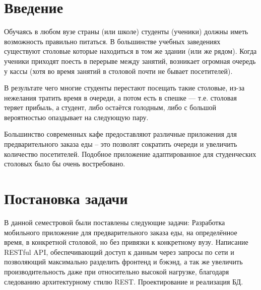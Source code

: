 \documentclass[14pt]{matmex-diploma-custom}
\begin{document}
\maketitle
\tableofcontents

\section{Введение}
    Обучаясь в любом вузе страны (или школе) студенты (ученики) должны иметь возможность правильно питаться.
    В большинстве учебных заведениях существуют столовые которые находиться в том же здании (или же рядом).
    Когда ученики приходят поесть в перерыве между занятий, возникает огромная очередь у кассы (хотя во время занятий в столовой почти не бывает посетителей).

    В результате чего многие студенты перестают посещать такие столовые, из-за нежелания тратить время в очереди, а потом есть в спешке — т.е. столовая теряет прибыль, а студент, либо остаётся голодным, либо с большой вероятностью опаздывает на следующую пару.

    Большинство современных кафе предоставляют различные приложения для предварительного заказа еды -- это позволят сократить очереди и увеличить количество посетителей. Подобное приложение адаптированное для студенческих столовых было бы очень востребовано.

\section{Постановка задачи}
    В данной семестровой были поставлены следующие задачи:
    Разработка мобильного приложение для предварительного заказа еды, на определённое время, в конкретной столовой, но без привязки к конкретному вузу.
    Написание RESTful API, обеспечивающий доступ к данным через запросы по сети и позволяющий максимально разделить фронтенд и бэкэнд, а так же увеличить производительность даже при относительно высокой нагрузке, благодаря следованию архитектурному стилю REST\cite{rest_xamarin}.
    Проектирование и реализация БД.
\end{document}
